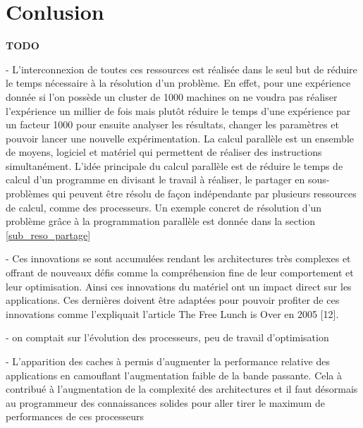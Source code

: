 \section{Conlusion}\label{sec:conclusion-hpc}





\textbf{TODO}
 
 - L'interconnexion de toutes ces ressources est réalisée dans le seul but de réduire le temps nécessaire à la résolution d'un problème. En effet, pour une expérience donnée si l'on possède un cluster de 1000 machines on ne voudra pas réaliser l'expérience un millier de fois mais plutôt réduire le temps d'une expérience par un facteur 1000 pour ensuite analyser les résultats, changer les paramètres et pouvoir lancer une nouvelle expérimentation. La calcul parallèle est un ensemble de moyens, logiciel et matériel qui permettent de réaliser des instructions simultanément. L'idée principale du calcul parallèle est de réduire le temps de calcul d'un programme en divisant le travail à réaliser, le partager en sous-problèmes qui peuvent être résolu de façon indépendante par plusieurs ressources de calcul, comme des processeurs. Un exemple concret de résolution d'un problème grâce à la programmation parallèle est donnée dans la section \ref{sub_reso_partage}

- Ces innovations se sont accumulées rendant les architectures très complexes et offrant de nouveaux défis comme la compréhension fine de leur comportement et leur optimisation. Ainsi ces innovations du matériel ont un impact direct sur les applications. Ces dernières doivent être adaptées pour pouvoir profiter de ces innovations comme l’expliquait l’article The Free Lunch is Over en 2005 [12].
  
  
- on comptait sur l'évolution des processeurs, peu de travail d'optimisation
      

- L'apparition des caches à permis d'augmenter la performance relative des applications en camouflant l'augmentation faible de la bande passante. Cela à contribué à l'augmentation de la complexité des architectures et il faut désormais au programmeur des connaissances solides pour aller tirer le maximum de performances de ces processeurs

